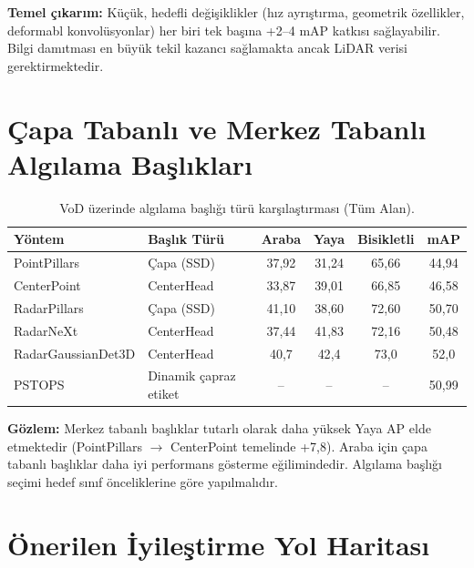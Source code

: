 \documentclass[a4paper,11pt]{article}
\begin{document}
\noindent
\textbf{Temel çıkarım:} Küçük, hedefli değişiklikler (hız ayrıştırma, geometrik özellikler, deformabl konvolüsyonlar) her biri tek başına +2--4 mAP katkısı sağlayabilir. Bilgi damıtması en büyük tekil kazancı sağlamakta ancak LiDAR verisi gerektirmektedir.

\section{Çapa Tabanlı ve Merkez Tabanlı Algılama Başlıkları}

\begin{table}[H]
\centering
\caption{VoD üzerinde algılama başlığı türü karşılaştırması (Tüm Alan).}
\label{tab:head_comparison}
\small
\renewcommand{\arraystretch}{1.15}
\begin{tabular}{@{}llcccc@{}}
\toprule
\textbf{Yöntem} & \textbf{Başlık Türü} & \textbf{Araba} & \textbf{Yaya} & \textbf{Bisikletli} & \textbf{mAP} \\
\midrule
PointPillars         & Çapa (SSD)             & 37{,}92 & 31{,}24 & 65{,}66 & 44{,}94 \\
CenterPoint          & CenterHead             & 33{,}87 & 39{,}01 & 66{,}85 & 46{,}58 \\
RadarPillars         & Çapa (SSD)             & 41{,}10 & 38{,}60 & 72{,}60 & 50{,}70 \\
RadarNeXt            & CenterHead             & 37{,}44 & 41{,}83 & 72{,}16 & 50{,}48 \\
RadarGaussianDet3D   & CenterHead             & 40{,}7  & 42{,}4  & 73{,}0  & 52{,}0 \\
PSTOPS               & Dinamik çapraz etiket  & --      & --      & --      & 50{,}99 \\
\bottomrule
\end{tabular}
\end{table}

\noindent
\textbf{Gözlem:} Merkez tabanlı başlıklar tutarlı olarak daha yüksek Yaya AP elde etmektedir (PointPillars $\to$ CenterPoint temelinde +7{,}8). Araba için çapa tabanlı başlıklar daha iyi performans gösterme eğilimindedir. Algılama başlığı seçimi hedef sınıf önceliklerine göre yapılmalıdır.

\section{Önerilen İyileştirme Yol Haritası}
\end{document}
